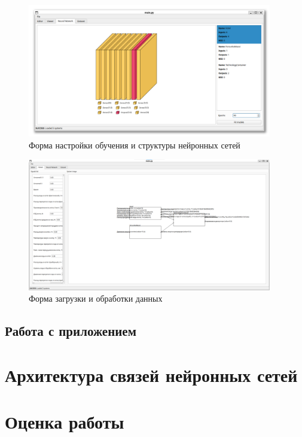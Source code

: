 \begin{figure}[H]
  \begin{center}
    \includegraphics[width=0.95\textwidth]{figures/modules/neural.png}
  \end{center}
  \caption{Форма настройки обучения и структуры нейронных сетей}\label{fig:forms:neural}
\end{figure}

\begin{figure}[H]
  \begin{center}
    \includegraphics[width=0.95\textwidth]{figures/modules/modelling.png}
  \end{center}
  \caption{Форма загрузки и обработки данных}\label{fig:forms:viewer}
\end{figure}

\subsection{Работа с приложением}

\section{Архитектура связей нейронных сетей}

\section{Оценка работы}
